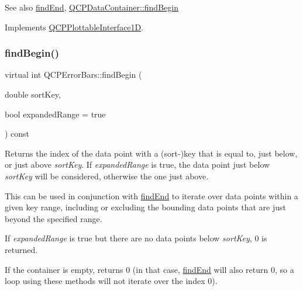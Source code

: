 \begin{DoxySeeAlso}{See also}
\hyperlink{class_q_c_p_error_bars_a64629f13bb290d41dd8f1b37346bfdd4}{find\+End}, \hyperlink{class_q_c_p_data_container_a2ad8a5399072d99a242d3a6d2d7e278a}{Q\+C\+P\+Data\+Container\+::find\+Begin} 
\end{DoxySeeAlso}


Implements \hyperlink{class_q_c_p_plottable_interface1_d_a5b95783271306a4de97be54eac1e7d13}{Q\+C\+P\+Plottable\+Interface1D}.

\mbox{\label{class_q_c_p_error_bars_aad74fa52d2471f23677faff1d8697cee}} 
\subsubsection{\texorpdfstring{find\+Begin()}{findBegin()}\hspace{0.1cm}{\footnotesize\ttfamily [2/2]}}
{\footnotesize\ttfamily virtual int Q\+C\+P\+Error\+Bars\+::find\+Begin (\begin{DoxyParamCaption}\item[{double}]{sort\+Key,  }\item[{bool}]{expanded\+Range = {\ttfamily true} }\end{DoxyParamCaption}) const\hspace{0.3cm}{\ttfamily [virtual]}}

Returns the index of the data point with a (sort-\/)key that is equal to, just below, or just above {\itshape sort\+Key}. If {\itshape expanded\+Range} is true, the data point just below {\itshape sort\+Key} will be considered, otherwise the one just above.

This can be used in conjunction with \hyperlink{class_q_c_p_error_bars_a64629f13bb290d41dd8f1b37346bfdd4}{find\+End} to iterate over data points within a given key range, including or excluding the bounding data points that are just beyond the specified range.

If {\itshape expanded\+Range} is true but there are no data points below {\itshape sort\+Key}, 0 is returned.

If the container is empty, returns 0 (in that case, \hyperlink{class_q_c_p_error_bars_a64629f13bb290d41dd8f1b37346bfdd4}{find\+End} will also return 0, so a loop using these methods will not iterate over the index 0).

